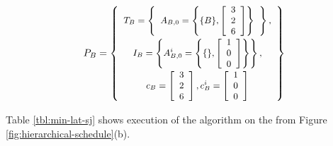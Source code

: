 \begin{displaymath} \small
P_B = \left\{
\begin{array}{c}
T_B = \left\{
\begin{array}{c}
A_{B,0} = \left\{ \{B\}, \left[\begin{array}{c} 3 \\ 2 \\ 6 \end{array}\right]\right\} \\
\end{array}\right\}, \\
I_B = \left\{ A^i_{B,0} = \left\{ \{ \}, \left[\begin{array}{c} 1 \\ 0 \\ 0 \end{array}\right]\right\} \right\}, \\
c_B = \left[ \begin{array}{c} 3 \\ 2 \\ 6 \end{array} \right],
c^i_B = \left[ \begin{array}{c} 1 \\ 0 \\ 0
\end{array} \right]
\end{array}
\right\}
\end{displaymath}

\noindent Table \ref{tbl:min-lat-sj} shows execution of the
algorithm on the {\splitjoin} from Figure
\ref{fig:hierarchical-schedule}(b).

